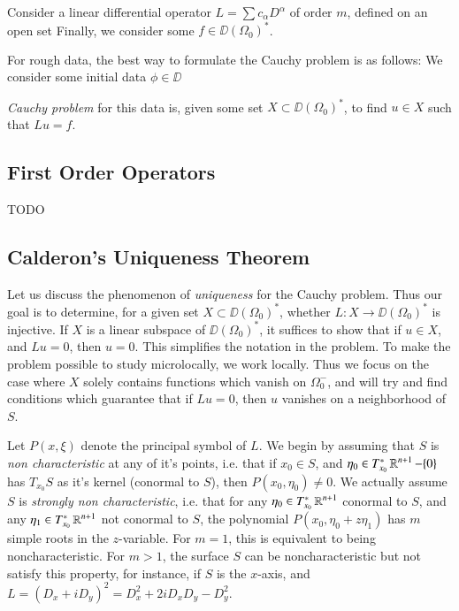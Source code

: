 Consider a linear differential operator $L = \sum c_\alpha D^\alpha$ of order $m$, defined on an open set  Finally, we consider some $f \in \DD(\Omega_0)^*$.

For rough data, the best way to formulate the Cauchy problem is as follows: We consider some initial data $\phi \in \DD$


\emph{Cauchy problem} for this data is, given some set $X \subset \DD(\Omega_0)^*$, to find $u \in X$ such that $Lu = f$.

\subsection{First Order Operators}

TODO

\subsection{Calderon's Uniqueness Theorem}

Let us discuss the phenomenon of \emph{uniqueness} for the Cauchy problem. Thus our goal is to determine, for a given set $X \subset \DD(\Omega_0)^*$, whether $L: X \to \DD(\Omega_0)^*$ is injective. If $X$ is a linear subspace of $\DD(\Omega_0)^*$, it suffices to show that if $u \in X$, and $Lu = 0$, then $u = 0$. This simplifies the notation in the problem. To make the problem possible to study microlocally, we work locally. Thus we focus on the case where $X$ solely contains functions which vanish on $\Omega_0^-$, and will try and find conditions which guarantee that if $Lu = 0$, then $u$ vanishes on a neighborhood of $S$.

Let $P(x,\xi)$ denote the principal symbol of $L$. We begin by assuming that $S$ is \emph{non characteristic} at any of it's points, i.e. that if $x_0 \in S$, and $\eta_0 \in T_{x_0}^* \operatorname{\mathbb{R}}^{n+1} - \{ 0 \}$ has $T_{x_0} S$ as it's kernel (conormal to $S$), then $P(x_0,\eta_0) \neq 0$. We actually assume $S$ is \emph{strongly non characteristic}, i.e. that for any $\eta_0 \in T_{x_0}^* \operatorname{\mathbb{R}}^{n+1}$ conormal to $S$, and any $\eta_1 \in T_{x_0}^* \operatorname{\mathbb{R}}^{n+1}$ not conormal to $S$, the polynomial $P(x_0, \eta_0 + z \eta_1)$ has $m$ simple roots in the $z$-variable. For $m = 1$, this is equivalent to being noncharacteristic. For $m > 1$, the surface $S$ can be noncharacteristic but not satisfy this property, for instance, if $S$ is the $x$-axis, and $L = (D_x + i D_y)^2 = D_x^2 + 2i D_x D_y - D_y^2$.

